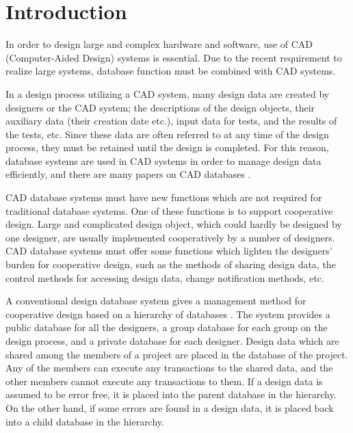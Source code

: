 \section{Introduction}
\label{sec:intro}
In order to design large and complex hardware and software, use of CAD 
(Computer-Aided Design) systems is essential.
Due to the recent requirement to realize large systems, database
function must be combined with CAD systems.

In a design process utilizing a CAD system, many design data are created by
designers or the CAD system; the descriptions of the design objects,
their auxiliary data (their creation date etc.), input data for tests, 
and the results of the tests, etc.
Since these data are often referred to at any time of the design 
process, they must be retained until the design is completed.
For this reason, database systems are used in CAD systems in order to 
manage design data efficiently, and there are many papers on CAD 
databases
\cite{Batory:acmtrans85,Bancilhon:vldb85,Chou:vldb86,Katz:da86,Ketabchi:ieeetransse88,Klahold:sigmod85}.

CAD database systems must have new functions which are not 
required for traditional database systems.
One of these functions is to support cooperative design.
Large and complicated design object, which could hardly
be designed by one designer, are usually implemented cooperatively by a
number of designers.
CAD database systems must offer some functions which lighten the
designers' burden for cooperative design, such as the methods of 
sharing design data, the control methods for accessing design data, 
change notification methods, etc.

A conventional design database system gives a management method for cooperative
design based on a hierarchy of databases
\cite{Chou:vldb86,Klahold:sigmod85}.
The system provides a public database for all the designers, a group
database for each group on the design process, and a private database
for each designer.
Design data which are shared among the members of a project are placed 
in the database of the project.
Any of the members can execute any transactions to the shared data, and
the other members cannot execute any transactions to them.
If a design data is assumed to be error free, it is placed into the
parent database in the hierarchy.
On the other hand, if some errors are found in a design data, it is 
placed back into a child database in the hierarchy.

